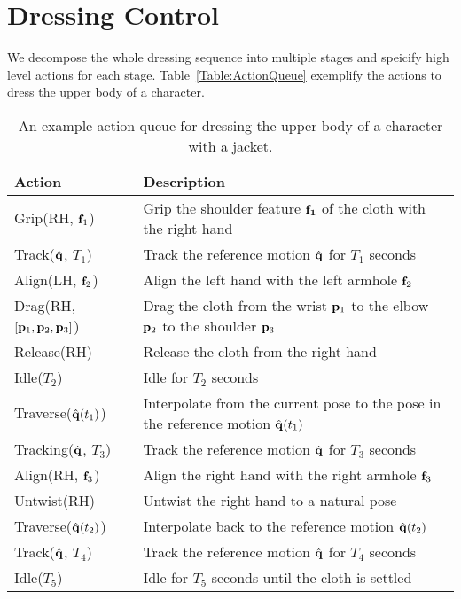 \section{Dressing Control}

We decompose the whole dressing sequence into multiple stages and speicify high level actions for each stage. Table~\ref{Table:ActionQueue} exemplify the actions to dress the upper body of a character.

\begin{table*}
  \centering
  \begin{tabular}{l|l}
    \hline
    Action & Description \\
    \hline
    Grip(RH, $\mathbf{f}_{1}$) & Grip the shoulder feature $\mathbf{f_1}$ of the cloth with the right hand\\
    Track($\hat{\mathbf{q}}$, $T_1$) & Track the reference motion $\hat{\mathbf{q}}$ for $T_1$ seconds\\
    Align(LH, $\mathbf{f}_{2}$) & Align the left hand with the left armhole $\mathbf{f}_2$\\
    Drag(RH, $[\mathbf{p}_1, \mathbf{p}_2, \mathbf{p}_3]$) & Drag the cloth from the wrist $\mathbf{p}_1$ to the elbow $\mathbf{p}_2$ to the shoulder $\mathbf{p}_3$\\
    Release(RH) & Release the cloth from the right hand\\
    Idle($T_2$) & Idle for $T_2$ seconds\\
    Traverse($\hat{\mathbf{q}}(t_1)$) & Interpolate from the current pose to the pose in the reference motion $\hat{\mathbf{q}}(t_1)$\\
    Tracking($\hat{\mathbf{q}}$, $T_3$) & Track the reference motion $\hat{\mathbf{q}}$ for $T_3$ seconds\\
    Align(RH, $\mathbf{f}_{3}$) & Align the right hand with the right armhole $\mathbf{f}_3$\\
    Untwist(RH) & Untwist the right hand to a natural pose\\
    Traverse($\hat{\mathbf{q}}(t_2)$) & Interpolate back to the reference motion $\hat{\mathbf{q}}(t_2)$\\
    Track($\hat{\mathbf{q}}$, $T_4$) & Track the reference motion $\hat{\mathbf{q}}$ for $T_4$ seconds \\
    Idle($T_5$) & Idle for $T_5$ seconds until the cloth is settled\\
    \hline
  \end{tabular}
  \caption{An example action queue for dressing the upper body of a character with a jacket.}
\end{table*}

